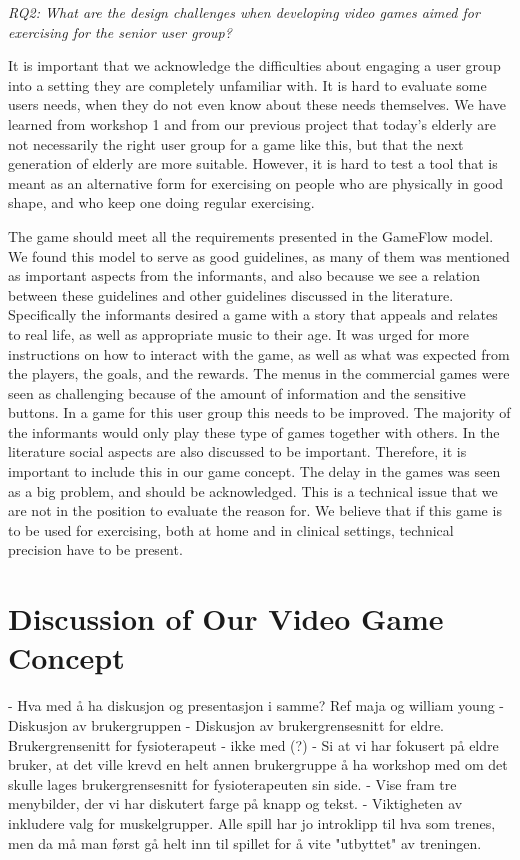 \emph{RQ2: What are the design challenges when developing video games aimed for exercising for the senior user group?}

It is important that we acknowledge the difficulties about engaging a user group into a setting they are completely unfamiliar with. It is hard to evaluate some users needs, when they do not even know about these needs themselves. We have learned from workshop 1 and from our previous project that today's elderly are not necessarily the right user group for a game like this, but that the next generation of elderly are more suitable. However, it is hard to test a tool that is meant as an alternative form for exercising on people who are physically in good shape, and who keep one doing regular exercising. 

The game should meet all the requirements presented in the GameFlow model. We found this model to serve as good guidelines, as many of them was mentioned as important aspects from the informants, and also because we see a relation between these guidelines and other guidelines discussed in the literature. Specifically the informants desired a game with a story that appeals and relates to real life, as well as appropriate music to their age. It was urged for more instructions on how to interact with the game, as well as what was expected from the players, the goals, and the rewards. The menus in the commercial games were seen as challenging because of the amount of information and the sensitive buttons. In a game for this user group this needs to be improved. The majority of the informants would only play these type of games together with others. In the literature social aspects are also discussed to be important. Therefore, it is important to include this in our game concept. The delay in the games was seen as a big problem, and should be acknowledged.  This is a technical issue that we are not in the position to evaluate the reason for. We believe that if this game is to be used for exercising, both at home and in clinical settings, technical precision have to be present. 
 


\section{Discussion of Our Video Game Concept}
- Hva med å ha diskusjon og presentasjon i samme? Ref maja og william young
- Diskusjon av brukergruppen
- Diskusjon av brukergrensesnitt for eldre. Brukergrensenitt for fysioterapeut - ikke med (?)
- Si at vi har fokusert på eldre bruker, at det ville krevd en helt annen brukergruppe å ha workshop med om det skulle lages brukergrensesnitt for fysioterapeuten sin side.
- Vise fram tre menybilder, der vi har diskutert farge på knapp og tekst. 
- Viktigheten av inkludere valg for muskelgrupper. Alle spill har jo introklipp til hva som trenes, men da må man først gå helt inn til spillet for å vite "utbyttet" av treningen.

